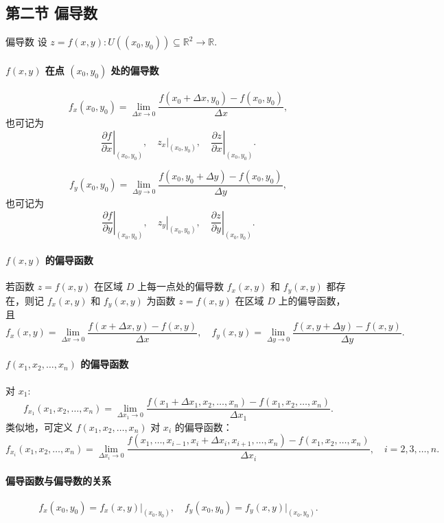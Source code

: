 \subsection{第二节 偏导数}
\begin{dy}{偏导数}{}
设 \( z = f(x,y): U((x_0,y_0)) \subseteq \mathbb{R}^2 \to \mathbb{R} \).
\paragraph{ \( f(x,y) \) 在点 \( (x_0,y_0) \) 处的偏导数}
\[
f_x(x_0,y_0) = \lim_{\Delta x \to 0} \frac{f(x_0+\Delta x,y_0) - f(x_0,y_0)}{\Delta x},
\]
也可记为
\[
\left. \frac{\partial f}{\partial x} \right|_{(x_0,y_0)},\quad
\left. z_x \right|_{(x_0,y_0)},\quad
\left. \frac{\partial z}{\partial x} \right|_{(x_0,y_0)}.
\]

\[
f_y(x_0,y_0) = \lim_{\Delta y \to 0} \frac{f(x_0,y_0+\Delta y) - f(x_0,y_0)}{\Delta y},
\]
也可记为
\[
\left. \frac{\partial f}{\partial y} \right|_{(x_0,y_0)},\quad
\left. z_y \right|_{(x_0,y_0)},\quad
\left. \frac{\partial z}{\partial y} \right|_{(x_0,y_0)}.
\]

\paragraph{\( f(x,y) \) 的偏导函数}
若函数 \( z = f(x,y) \) 在区域 \( D \) 上每一点处的偏导数 \( f_x(x,y) \) 和 \( f_y(x,y) \) 都存在，则记 \( f_x(x,y) \) 和 \( f_y(x,y) \) 为函数 \( z = f(x,y) \) 在区域 \( D \) 上的偏导函数，且
\[
f_x(x,y) = \lim_{\Delta x \to 0} \frac{f(x+\Delta x,y) - f(x,y)}{\Delta x},
\quad
f_y(x,y) = \lim_{\Delta y \to 0} \frac{f(x,y+\Delta y) - f(x,y)}{\Delta y}.
\]

\paragraph{ \( f(x_1,x_2,\dots,x_n) \) 的偏导函数}
对 \( x_1 \):
\[
f_{x_1}(x_1,x_2,\dots,x_n)
= \lim_{\Delta x_1 \to 0} \frac{f(x_1+\Delta x_1,x_2,\dots,x_n) - f(x_1,x_2,\dots,x_n)}{\Delta x_1}.
\]
类似地，可定义 \( f(x_1,x_2,\dots,x_n) \) 对 \( x_i \) 的偏导函数：
\[
f_{x_i}(x_1,x_2,\dots,x_n)
= \lim_{\Delta x_i \to 0} \frac{f(x_1,\dots,x_{i-1},x_i+\Delta x_i,x_{i+1},\dots,x_n) - f(x_1,x_2,\dots,x_n)}{\Delta x_i},
\quad i=2,3,\dots,n.
\]

\paragraph{ 偏导函数与偏导数的关系}
\[
f_x(x_0,y_0) = f_x(x,y)\big|_{(x_0,y_0)},\quad
f_y(x_0,y_0) = f_y(x,y)\big|_{(x_0,y_0)}.
\]
\end{dy}
